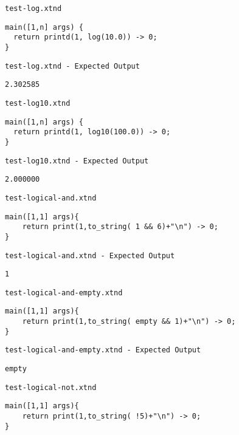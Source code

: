 \medskip \noindent \texttt{test-log.xtnd}


\begin{lstlisting}
main([1,n] args) {
  return printd(1, log(10.0)) -> 0;
}
\end{lstlisting}


\medskip \noindent \texttt{test-log.xtnd - Expected Output}


\begin{lstlisting}
2.302585
\end{lstlisting}


\medskip \noindent \texttt{test-log10.xtnd}


\begin{lstlisting}
main([1,n] args) {
  return printd(1, log10(100.0)) -> 0;
}
\end{lstlisting}


\medskip \noindent \texttt{test-log10.xtnd - Expected Output}


\begin{lstlisting}
2.000000
\end{lstlisting}


\medskip \noindent \texttt{test-logical-and.xtnd}


\begin{lstlisting}
main([1,1] args){
	return print(1,to_string( 1 && 6)+"\n") -> 0;
}
\end{lstlisting}


\medskip \noindent \texttt{test-logical-and.xtnd - Expected Output}


\begin{lstlisting}
1
\end{lstlisting}


\medskip \noindent \texttt{test-logical-and-empty.xtnd}


\begin{lstlisting}
main([1,1] args){
	return print(1,to_string( empty && 1)+"\n") -> 0;
}
\end{lstlisting}


\medskip \noindent \texttt{test-logical-and-empty.xtnd - Expected Output}


\begin{lstlisting}
empty
\end{lstlisting}


\medskip \noindent \texttt{test-logical-not.xtnd}


\begin{lstlisting}
main([1,1] args){
	return print(1,to_string( !5)+"\n") -> 0;
}
\end{lstlisting}


